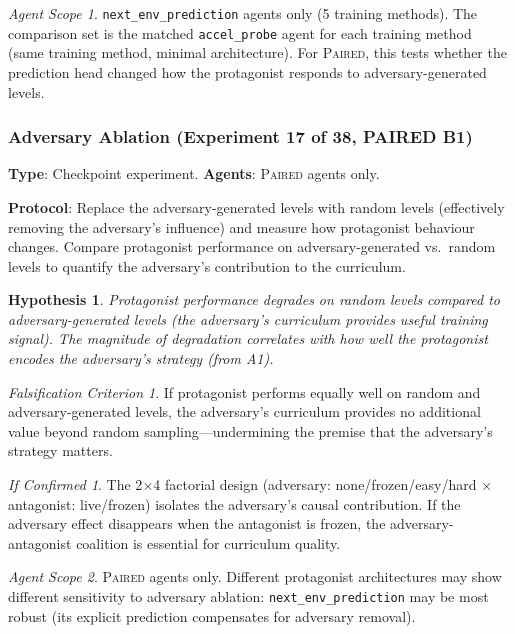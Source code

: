\documentclass[11pt,a4paper]{article}
\newtheorem{hypothesis}{Hypothesis}[subsection]
\theoremstyle{remark}
\newtheorem*{falsification}{Falsification Criterion}
\newtheorem*{implication}{If Confirmed}
\newtheorem*{agentscope}{Agent Scope}
\newcommand{\paired}{\textsc{Paired}}
\begin{document}
\begin{agentscope}
\texttt{next\_env\_prediction} agents only (5 training methods). The comparison set is the matched \texttt{accel\_probe} agent for each training method (same training method, minimal architecture). For \paired{}, this tests whether the prediction head changed how the protagonist responds to adversary-generated levels.
\end{agentscope}

\subsubsection{Adversary Ablation (Experiment 17 of 38, PAIRED B1)}
\label{exp:adversary_ablation}

\textbf{Type}: Checkpoint experiment. \textbf{Agents}: \paired{} agents only.

\textbf{Protocol}: Replace the adversary-generated levels with random levels (effectively removing the adversary's influence) and measure how protagonist behaviour changes. Compare protagonist performance on adversary-generated vs.\ random levels to quantify the adversary's contribution to the curriculum.

\begin{hypothesis}
Protagonist performance degrades on random levels compared to adversary-generated levels (the adversary's curriculum provides useful training signal). The magnitude of degradation correlates with how well the protagonist encodes the adversary's strategy (from A1).
\end{hypothesis}

\begin{falsification}
If protagonist performs equally well on random and adversary-generated levels, the adversary's curriculum provides no additional value beyond random sampling---undermining the premise that the adversary's strategy matters.
\end{falsification}

\begin{implication}
The 2$\times$4 factorial design (adversary: none/frozen/easy/hard $\times$ antagonist: live/frozen) isolates the adversary's causal contribution. If the adversary effect disappears when the antagonist is frozen, the adversary-antagonist coalition is essential for curriculum quality.
\end{implication}

\begin{agentscope}
\paired{} agents only. Different protagonist architectures may show different sensitivity to adversary ablation: \texttt{next\_env\_prediction} may be most robust (its explicit prediction compensates for adversary removal).
\end{agentscope}
\end{document}
